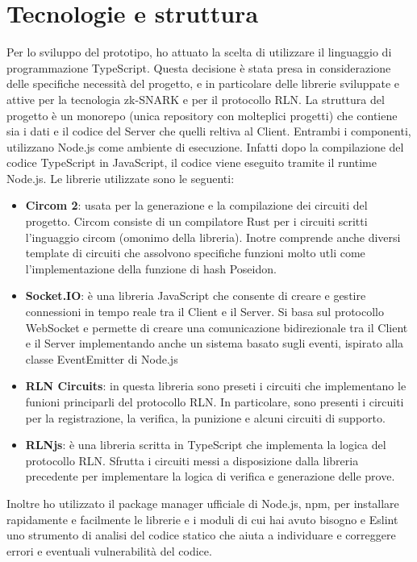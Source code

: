 \section{Tecnologie e struttura}
Per lo sviluppo del prototipo, ho attuato la scelta di utilizzare il linguaggio di programmazione TypeScript. Questa decisione è stata presa in considerazione delle specifiche necessità del progetto, e in particolare delle librerie sviluppate e attive per la tecnologia zk-SNARK e per il protocollo RLN. La struttura del progetto è un monorepo (unica repository con molteplici progetti) che contiene sia i dati e il codice del Server che quelli reltiva al Client. Entrambi i componenti, utilizzano Node.js come ambiente di esecuzione. Infatti dopo la compilazione del codice TypeScript in JavaScript, il codice viene eseguito tramite il runtime Node.js. 
Le librerie utilizzate sono le seguenti:
\begin{itemize}
    \item \textbf{Circom 2}: usata per la generazione e la compilazione dei circuiti del progetto. Circom consiste di un compilatore Rust per i circuiti scritti l'inguaggio circom (omonimo della libreria). Inotre comprende anche diversi template di circuiti che assolvono specifiche funzioni molto utli come l'implementazione della funzione di hash Poseidon.
    \item \textbf{Socket.IO}: è una libreria JavaScript che consente di creare e gestire connessioni in tempo reale tra il Client e il Server. Si basa sul protocollo WebSocket e permette di creare una comunicazione bidirezionale tra il Client e il Server implementando anche un sistema basato sugli eventi, ispirato alla classe EventEmitter di Node.js
    \item \textbf{RLN Circuits}: in questa libreria sono preseti i circuiti che implementano le funioni principarli del protocollo RLN. In particolare, sono presenti i circuiti per la registrazione, la verifica, la punizione e alcuni circuiti di supporto.
    \item \textbf{RLNjs}: è una libreria scritta in TypeScript che implementa la logica del protocollo RLN. Sfrutta i circuiti messi a disposizione dalla libreria precedente per implementare la logica di verifica e generazione delle prove.
\end{itemize}

Inoltre ho utilizzato il package manager ufficiale di Node.js, npm, per installare rapidamente e facilmente le librerie e i moduli di cui hai avuto bisogno e Eslint uno strumento di analisi del codice statico che aiuta a individuare e correggere errori e eventuali vulnerabilità del codice.

